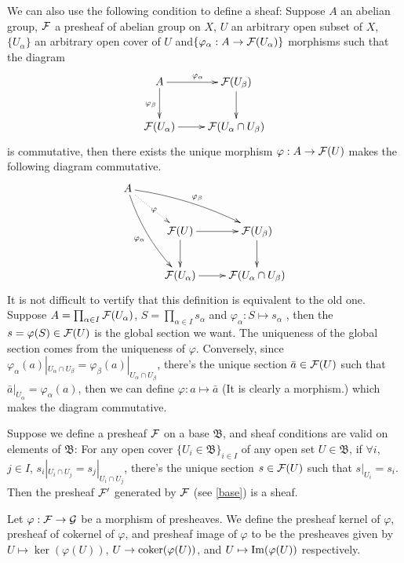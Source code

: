 \documentclass[10pt]{extbook}
\begin{document}


\para We can also use the following condition to define a sheaf: Suppose $A$ an abelian group, 
$\mathcal{F}$ a presheaf of abelian group on $X$, $U$ an arbitrary open subset of $X$, $\{U_\alpha\}$ 
an arbitrary open cover of $U$ and$\{\varphi_\alpha:A\to \mathcal{F}(U_\alpha)\}$ morphisms such that
the diagram
\[
	\xymatrix{
		A\ar[r]^{\varphi_{\alpha}}\ar[d]_{\varphi_{\beta}}&\calf(U_\beta)\ar[d]\\
		\calf(U_\alpha)\ar[r]&\calf(U_{\alpha}\cap U_{\beta})
	}
\]
is commutative, then there exists the unique morphism $\varphi:A\to \mathcal{F}(U)$ makes the 
following diagram commutative.
\[
	\xymatrix{
		A\ar@/_/[ddr]_{\varphi_{\alpha}}\ar@/^/[drr]^{\varphi_{\beta}}\ar@{.>}[dr]|{\varphi}&& \\
		&\calf(U)\ar[r]\ar[d]&\calf(U_\beta)\ar[d]\\
		&\calf(U_\alpha)\ar[r]&\calf(U_{\alpha}\cap U_{\beta})
	}
\]
It is not difficult to vertify that this definition is equivalent to the old one. Suppose 
$A=\prod_{\alpha\in I}\mathcal{F}(U_\alpha)$, $S=\prod_{\alpha\in I}s_\alpha$ and 
$\varphi_{\alpha}: S\mapsto s_{\alpha}$ , then the $s=\varphi(S) \in \mathcal{F}(U)$ is the global 
section we want. The uniqueness of the global section comes from the uniqueness of $\varphi$.
Conversely, since 
$\varphi_\alpha(a)|_{U_\alpha \cap U_\beta}=\varphi_\beta(a)|_{U_\alpha \cap U_\beta}$, 
there's the unique section $\bar{a} \in \mathcal{F}(U)$ such that 
$\bar{a}|_{U_\alpha}=\varphi_\alpha(a)$, then we can define $\varphi: a \mapsto \bar{a}$ 
(It is clearly a morphism.) which makes the diagram commutative.

\para Suppose we define a presheaf $\mathcal{F}$ on a base $\mathfrak{B}$, and sheaf conditions 
are valid on elements of $\mathfrak{B}$: For any open cover $\{U_i\in \mathfrak{B}\}_{i\in I}$ 
of any open set $U\in \mathfrak{B}$, if $\forall i$, $j\in I$, $s_i|_{U_i\cap U_j}=s_j|_{U_i\cap U_j}$, 
there's the unique section $s\in\mathcal{F}(U)$ such that $s|_{U_i}=s_i$. Then the presheaf $\mathcal{F}'$ generated by $\mathcal{F}$ (see \eqref{base}) is a sheaf.

\para Let $\varphi:\mathcal{F}\to\mathcal{G}$ be a morphism of presheaves. We define the presheaf kernel 
of $\varphi$, presheaf of cokernel of $\varphi$, and presheaf image of $\varphi$ to be the 
presheaves given by $U\mapsto \ker(\varphi(U))$, $U\to \operatorname{coker}(\varphi(U))$, and 
$U\mapsto \operatorname{Im}(\varphi(U))$ respectively.
\end{document}

